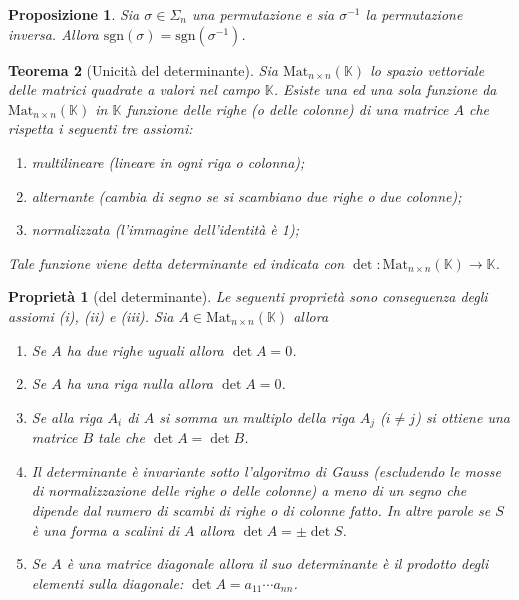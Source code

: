 \documentclass[9pt, a4paper]{article}
\newcommand{\K}{\mathbb{K}}
\newcommand{\sgn}{\mathrm{sgn}}
\theoremstyle{mythm}
\newtheorem{propriety}{Proprietà}[section]
\newtheorem{thm}{Teorema}[section]
\newtheorem{prop}[thm]{Proposizione}
\begin{document}
\begin{prop}
	Sia $ \sigma \in \Sigma_n $ una permutazione e sia $ \sigma^{-1} $ la permutazione inversa. Allora $ \sgn(\sigma) = \sgn(\sigma^{-1}) $. 
\end{prop}

\begin{thm}[Unicità del determinante]
	Sia $ \mathrm{Mat}_{n \times n} (\K) $  lo spazio vettoriale delle matrici quadrate  a valori nel campo $ \K $. Esiste una ed una sola funzione da $ \mathrm{Mat}_{n \times n} (\K) $ in $ \K $ funzione delle righe (o delle colonne) di una matrice $ A $ che rispetta i seguenti tre assiomi:  
	\begin{enumerate}[label = (\roman*)]
		\item \emph{multilineare} (lineare in ogni riga o colonna);
		\item \emph{alternante} (cambia di segno se si scambiano due righe o due colonne);
		\item \emph{normalizzata} (l'immagine dell'identità è 1);
	\end{enumerate}
	Tale funzione viene detta determinante ed indicata con $ \det \colon \mathrm{Mat}_{n \times n} (\K) \to \K $. 
\end{thm}

\begin{propriety}[del determinante] \label{prop:det}
	Le seguenti proprietà sono conseguenza degli assiomi (i), (ii) e (iii). Sia $ A \in \mathrm{Mat}_{n \times n} (\K) $ allora
	\begin{enumerate}[label = (\arabic*)]
		\item Se $ A $ ha due righe uguali allora $ \det{A} = 0 $.
		\item Se $ A $ ha una riga nulla allora $ \det{A} = 0 $.
		\item Se alla riga $ A_i $ di $ A $ si somma un multiplo della riga $ A_j $ ($ i \neq j $) si ottiene una matrice $ B $ tale che $ \det A = \det B $. 
		\item Il determinante è invariante sotto l'algoritmo di Gauss (escludendo le mosse di \emph{normalizzazione} delle righe o delle colonne) a meno di un segno che dipende dal numero di scambi di righe o di colonne fatto. In altre parole se $ S $ è una forma a scalini di $ A $ allora $ \det A = \pm \det S $.
		\item Se $ A $ è una matrice diagonale allora il suo determinante è il prodotto degli elementi sulla diagonale: $ \det A = a_{11} \cdots a_{nn} $. 
	\end{enumerate}
\end{propriety}
\end{document}
